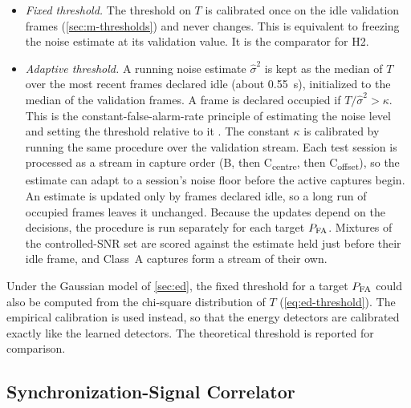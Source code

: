 \begin{itemize}
  \item \emph{Fixed threshold.} The threshold on $T$ is calibrated once on the idle validation frames (\cref{sec:m-thresholds}) and never changes. This is equivalent to freezing the noise estimate at its validation value. It is the comparator for H2.
  \item \emph{Adaptive threshold.} A running noise estimate $\hat{\sigma}^2$ is kept as the median of $T$ over the most recent  frames declared idle (about \qty{0.55}{\second}), initialized to the median of the validation frames. A frame is declared occupied if $T/\hat{\sigma}^2 > \kappa$. This is the constant-false-alarm-rate principle of estimating the noise level and setting the threshold relative to it \parencite[p.~121]{yucek2009}. The constant $\kappa$ is calibrated by running the same procedure over the validation stream. Each test session is processed as a stream in capture order (B, then C\textsubscript{centre}, then C\textsubscript{offset}), so the estimate can adapt to a session's noise floor before the active captures begin. An estimate is updated only by frames declared idle, so a long run of occupied frames leaves it unchanged. Because the updates depend on the decisions, the procedure is run separately for each target $P_{\mathrm{FA}}$. Mixtures of the controlled-SNR set are scored against the estimate held just before their idle frame, and Class~A captures form a stream of their own.
\end{itemize}

Under the Gaussian model of \cref{sec:ed}, the fixed threshold for a target $P_{\mathrm{FA}}$ could also be computed from the chi-square distribution of $T$ (\cref{eq:ed-threshold}). The empirical calibration is used instead, so that the energy detectors are calibrated exactly like the learned detectors. The theoretical threshold is reported for comparison.

\subsection{Synchronization-Signal Correlator}
\label{sec:m-pss}


